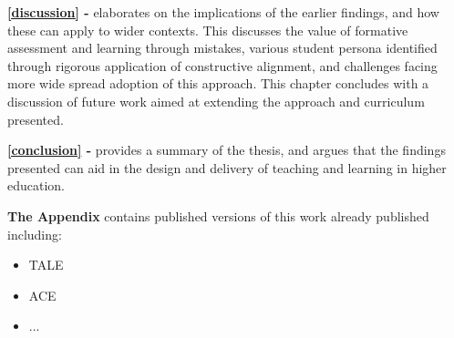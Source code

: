

\textbf{\cref{discussion} - } elaborates on the implications of the earlier findings, and how these can apply to wider contexts. This discusses the value of formative assessment and learning through mistakes, various student persona identified through rigorous application of constructive alignment, and challenges facing more wide spread adoption of this approach. This chapter concludes with a discussion of future work aimed at extending the approach and curriculum presented.

\textbf{\cref{conclusion} - } provides a summary of the thesis, and argues that the findings presented can aid in the design and delivery of teaching and learning in higher education. 

\textbf{The Appendix} contains published versions of this work already published including:
\begin{itemize}
	\item TALE
	\item ACE
	\item ...
\end{itemize}




